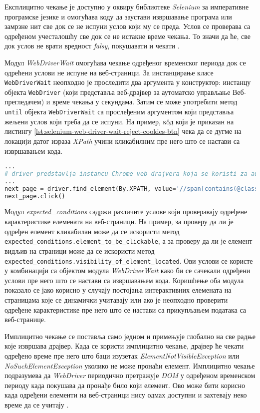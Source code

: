 \documentclass[12pt,oneside]{memoir}
\begin{document}
Експлицитно чекање је доступно у оквиру библиотеке \textit{Selenium} за императивне програмске језике и омогућава коду да заустави извршавање програма или замрзне нит све док се не испуни услов који му се преда. Услов се проверава са одређеном учесталошћу све док се не истакне време чекања. То значи да ће, све док услов не врати вредност \textit{falsy}, покушавати и чекати \cite{selenium}.

Модул \textit{WebDriverWait} омогућава чекање одређеног временског периода док се одрећени услови не испуне на веб-страници. За инстанцирање класе \texttt{WebDriverWait} неопходно је проследити два аргумента у конструктор: инстанцу објекта \texttt{WebDriver} (који представља веб-драјвер за аутоматско управљање Веб-прегледачем) и време чекања у секундама.
Затим се може употребити метод \texttt{until} објекта \texttt{WebDriverWait} са прослеђеним аргументом који представља жељени услов који треба да се испуни. На пример, кôд који је приказан на листингу \ref{lst:selenium-web-driver-wait-reject-cookies-btn} чека да се дугме на локацији датог израза \textit{XPath} учини кликабилним пре него што се настави са извршавањем кода. 
\begin{lstlisting}[language=Python, caption={Симулација клика на елемент}, label={lst:selenium-web-driver-wait-reject-cookies-btn}]
...
# driver predstavlja instancu Chrome veb drajvera koja se koristi za automatizaciju pregledaca
...
next_page = driver.find_element(By.XPATH, value='//span[contains(@class, "nextButton")]')
next_page.click()
\end{lstlisting}

Модул \textit{expected\_conditions} садржи различите услове који проверавају одређене карактеристике елемената на веб-страници. На пример, за проверу да ли је одређен елемент кликабилан може да се искористи метод \texttt{expected\_conditions.element\_to\_be\_clickable}, а за проверу да ли је елемент видљив на страници може да се искористи метод \texttt{expected\_conditions.visibility\_of\_element\_located}.
Ови услови се користе у комбинацији са објектом модула \textit{WebDriverWait} како би се сачекали одређени услови пре него што се настави са извршавањем кода.
Коришћење оба модула показало се јако корисно у случају постојања интерактивних елемената на страницама које се динамички учитавају или ако је неопходно проверити одређене карактеристике пре него што се настави са прикупљањем података са веб-странице.

Имплицитно чекање се поставља само једном и примењује глобално на све радње које извршава драјвер. Када се користи имплицитно чекање, драјвер ће чекати одређено време пре него што баци изузетак \textit{ElementNotVisibleException} или \textit{NoSuchElementException} уколико не може пронаћи елемент. Имплицитно чекање подразумева да \textit{WebDriver} периодично претражује \textit{DOM} у одређеном временском периоду када покушава да пронађе било који елемент. Ово може бити корисно када одређени елементи на веб-страници нису одмах доступни и захтевају неко време да се учитају \cite{selenium}.
\end{document}
